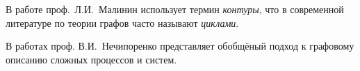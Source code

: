\def\notedate{2022.01.01}
\def\currentauthor{Соколов А.П. (РК-6)}


В работе \cite{ErmilovLI1970} проф.~Л.И.~Малинин использует термин \textit{контуры}, что в современной литературе по теории графов часто называют \textit{циклами}.

В работах \cite{NechiporenkoVI1968, NechiporenkoVI1977} проф. В.И.~Нечипоренко представляет обобщёный подход к графовому описанию сложных процессов и систем.

\noteattributes{}
